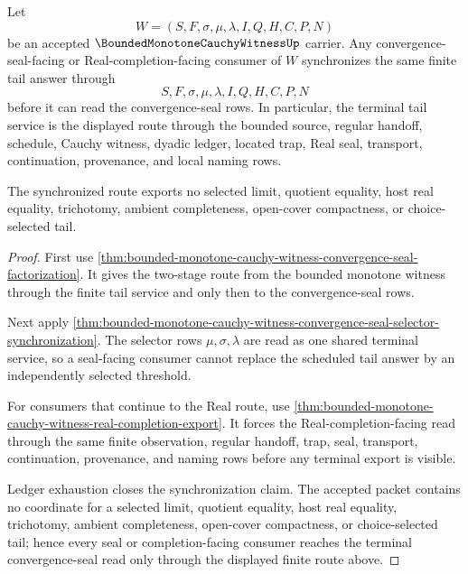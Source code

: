 \begin{theorem}
\label{thm:bounded-monotone-cauchy-witness-convergence-seal-terminal-synchronization}
Let
$$
W=(S,F,\sigma,\mu,\lambda,I,Q,H,C,P,N)
$$
be an accepted $\BoundedMonotoneCauchyWitnessUp$ carrier. Any convergence-seal-facing or Real-completion-facing consumer of $W$ synchronizes the same finite tail answer through
$$
S,F,\sigma,\mu,\lambda,I,Q,H,C,P,N
$$
before it can read the convergence-seal rows. In particular, the terminal tail service is the displayed route through the bounded source, regular handoff, schedule, Cauchy witness, dyadic ledger, located trap, Real seal, transport, continuation, provenance, and local naming rows.

The synchronized route exports no selected limit, quotient equality, host real equality, trichotomy, ambient completeness, open-cover compactness, or choice-selected tail.
\end{theorem}
\begin{proof}
First use \autoref{thm:bounded-monotone-cauchy-witness-convergence-seal-factorization}. It gives the two-stage route from the bounded monotone witness through the finite tail service and only then to the convergence-seal rows.

Next apply \autoref{thm:bounded-monotone-cauchy-witness-convergence-seal-selector-synchronization}. The selector rows $\mu,\sigma,\lambda$ are read as one shared terminal service, so a seal-facing consumer cannot replace the scheduled tail answer by an independently selected threshold.

For consumers that continue to the Real route, use \autoref{thm:bounded-monotone-cauchy-witness-real-completion-export}. It forces the Real-completion-facing read through the same finite observation, regular handoff, trap, seal, transport, continuation, provenance, and naming rows before any terminal export is visible.

Ledger exhaustion closes the synchronization claim. The accepted packet contains no coordinate for a selected limit, quotient equality, host real equality, trichotomy, ambient completeness, open-cover compactness, or choice-selected tail; hence every seal or completion-facing consumer reaches the terminal convergence-seal read only through the displayed finite route above.
\end{proof}




